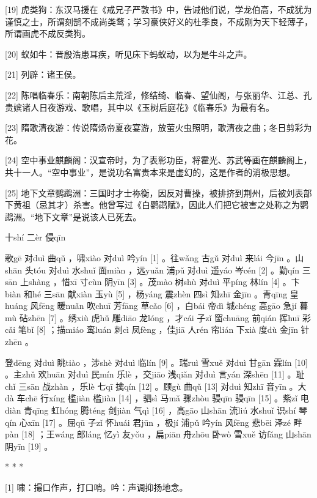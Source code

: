 \documentclass[12pt,UTF8]{ctexbook}
\begin{document}
[19] 虎类狗：东汉马援在《戒兄子严敦书》中，告诫他们说，学龙伯高，不成犹为谨慎之士，所谓刻鹄不成尚类鹜；学习豪侠好义的杜季良，不成刚为天下轻薄子，所谓画虎不成反类狗。

[20] 蚁如牛：晋殷浩患耳疾，听见床下蚂蚁动，以为是牛斗之声。

[21] 列辟：诸王侯。

[22] 陈唱临春乐：南朝陈后主荒淫，修结绮、临春、望仙阁，与张丽华、江总、孔贵嫔诸人日夜游戏、歌唱，其中以《玉树后庭花》《临春乐》为最有名。

[23] 隋歌清夜游：传说隋炀帝夏夜宴游，放萤火虫照明，歌清夜之曲；冬日剪彩为花。

[24] 空中事业麒麟阁：汉宣帝时，为了表彰功臣，将霍光、苏武等画在麒麟阁上，共十一人。“空中事业”，是说功名富贵本来是虚幻的，这是作者的消极思想。

[25] 地下文章鹦鹉洲：三国时才士祢衡，因反对曹操，被排挤到荆州，后被刘表部下黄祖（忌其才）杀害。他曾写过《白鹦鹉赋》，因此人们把它被害之处称之为鹦鹉洲。“地下文章”是说该人已死去。





十shí 二èr 侵qīn


歌gē 对duì 曲qǔ ，啸xiào 对duì 吟yín [1] 。往wǎng 古gǔ 对duì 来lái 今jīn 。山shān 头tóu 对duì 水shuǐ 面miàn ，远yuǎn 浦pǔ 对duì 遥yáo 岑cén [2] 。勤qín 三sān 上shàng ，惜xī 寸cùn 阴yīn [3] 。茂mào 树shù 对duì 平píng 林lín [4] 。卞biàn 和hé 三sān 献xiàn 玉yù [5] ，杨yáng 震zhèn 四sì 知zhī 金jīn 。青qīng 皇huáng 风fēng 暖nuǎn 吹chuī 芳fāng 草cǎo [6] ，白bái 帝dì 城chéng 高gāo 急jí 暮mù 砧zhēn [7] 。绣xiù 虎hǔ 雕diāo 龙lóng ，才cái 子zǐ 窗chuāng 前qián 挥huī 彩cǎi 笔bǐ [8] ；描miáo 鸾luán 刺cì 凤fèng ，佳jiā 人rén 帘lián 下xià 度dù 金jīn 针zhēn 。

登dēng 对duì 眺tiào ，涉shè 对duì 临lín [9] 。瑞ruì 雪xuě 对duì 甘gān 霖lín [10] 。主zhǔ 欢huān 对duì 民mín 乐lè ，交jiāo 浅qiǎn 对duì 言yán 深shēn [11] 。耻chǐ 三sān 战zhàn ，乐lè 七qī 擒qín [12] 。顾gù 曲qǔ [13] 对duì 知zhī 音yīn 。大dà 车chē 行xíng 槛jiàn 槛jiàn [14] ，驷sì 马mǎ 骤zhòu 骎qīn 骎qīn [15] 。紫zǐ 电diàn 青qīng 虹hóng 腾téng 剑jiàn 气qì [16] ，高gāo 山shān 流liú 水shuǐ 识shí 琴qín 心xīn [17] 。屈qū 子zǐ 怀huái 君jūn ，极jí 浦pǔ 吟yín 风fēng 悲bēi 泽zé 畔pàn [18] ；王wáng 郎láng 忆yì 友yǒu ，扁piān 舟zhōu 卧wò 雪xuě 访fǎng 山shān 阴yīn [19] 。



* * *



[1] 啸：撮口作声，打口哨。吟：声调抑扬地念。
\end{document}
